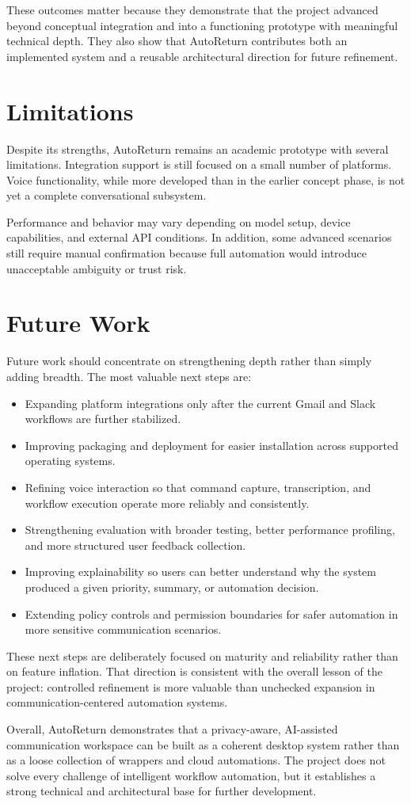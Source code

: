 These outcomes matter because they demonstrate that the project advanced beyond conceptual integration and into a functioning prototype with meaningful technical depth. They also show that AutoReturn contributes both an implemented system and a reusable architectural direction for future refinement.

\section{Limitations}
Despite its strengths, AutoReturn remains an academic prototype with several limitations. Integration support is still focused on a small number of platforms. Voice functionality, while more developed than in the earlier concept phase, is not yet a complete conversational subsystem.

Performance and behavior may vary depending on model setup, device capabilities, and external API conditions. In addition, some advanced scenarios still require manual confirmation because full automation would introduce unacceptable ambiguity or trust risk.

\section{Future Work}
Future work should concentrate on strengthening depth rather than simply adding breadth. The most valuable next steps are:
\begin{itemize}
    \item Expanding platform integrations only after the current Gmail and Slack workflows are further stabilized.
    \item Improving packaging and deployment for easier installation across supported operating systems.
    \item Refining voice interaction so that command capture, transcription, and workflow execution operate more reliably and consistently.
    \item Strengthening evaluation with broader testing, better performance profiling, and more structured user feedback collection.
    \item Improving explainability so users can better understand why the system produced a given priority, summary, or automation decision.
    \item Extending policy controls and permission boundaries for safer automation in more sensitive communication scenarios.
\end{itemize}

These next steps are deliberately focused on maturity and reliability rather than on feature inflation. That direction is consistent with the overall lesson of the project: controlled refinement is more valuable than unchecked expansion in communication-centered automation systems.

Overall, AutoReturn demonstrates that a privacy-aware, AI-assisted communication workspace can be built as a coherent desktop system rather than as a loose collection of wrappers and cloud automations. The project does not solve every challenge of intelligent workflow automation, but it establishes a strong technical and architectural base for further development.
